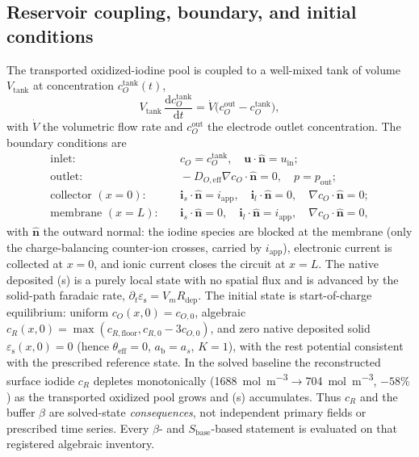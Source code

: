 \documentclass[11pt]{article}
\newcommand{\epss}{\varepsilon_{\mathrm{s}}}
\newcommand{\iapp}{i_{\mathrm{app}}}
\begin{document}
\subsection{Reservoir coupling, boundary, and initial conditions}\label{sec:tankbc}
The transported oxidized-iodine pool is coupled to a well-mixed tank of volume $V_{\mathrm{tank}}$ at
concentration $c_O^{\mathrm{tank}}(t)$,
\begin{equation}
V_{\mathrm{tank}}\,\frac{\mathrm{d}c_O^{\mathrm{tank}}}{\mathrm{d}t}
=\dot V\bigl(c_O^{\mathrm{out}}-c_O^{\mathrm{tank}}\bigr),
\label{eq:tank}
\end{equation}
with $\dot V$ the volumetric flow rate and $c_O^{\mathrm{out}}$ the electrode outlet concentration. The
boundary conditions are
\begin{align}
\text{inlet:}&\quad c_O=c_O^{\mathrm{tank}},\quad \mathbf{u}\!\cdot\!\hat{\mathbf n}=u_{\mathrm{in}};
\label{eq:bcin}\\
\text{outlet:}&\quad -D_{O,\mathrm{eff}}\nabla c_O\!\cdot\!\hat{\mathbf n}=0,\quad p=p_{\mathrm{out}};
\label{eq:bcout}\\
\text{collector }(x{=}0):&\quad \mathbf{i}_s\!\cdot\!\hat{\mathbf n}=\iapp,\quad
\mathbf{i}_l\!\cdot\!\hat{\mathbf n}=0,\quad \nabla c_O\!\cdot\!\hat{\mathbf n}=0;
\label{eq:bccc}\\
\text{membrane }(x{=}L):&\quad \mathbf{i}_s\!\cdot\!\hat{\mathbf n}=0,\quad
\mathbf{i}_l\!\cdot\!\hat{\mathbf n}=\iapp,\quad \nabla c_O\!\cdot\!\hat{\mathbf n}=0,
\label{eq:bcmem}
\end{align}
with $\hat{\mathbf n}$ the outward normal: the iodine species are blocked at the membrane (only the
charge-balancing counter-ion crosses, carried by $\iapp$), electronic current is collected at $x=0$, and
ionic current closes the circuit at $x=L$. The native deposited (s) is a purely local state with no
spatial flux and is advanced by the solid-path faradaic rate, $\partial_t\epss=V_mR_{\mathrm{dep}}$.
The initial state is start-of-charge equilibrium: uniform $c_O(x,0)=c_{O,0}$, algebraic
$c_R(x,0)=\max(c_{R,\mathrm{floor}},c_{R,0}-3c_{O,0})$, and zero native deposited solid
$\epss(x,0)=0$ (hence $\theta_{\mathrm{eff}}=0$, $a_{\mathrm b}=a_s$, $K=1$), with the rest potential
consistent with the prescribed reference state. In the solved baseline the reconstructed surface iodide
$c_R$ depletes monotonically (\SI{1688}{mol.m^{-3}}$\to$\SI{704}{mol.m^{-3}}, $-58\%$) as the transported
oxidized pool grows and (s) accumulates. Thus $c_R$ and the buffer $\beta$ are solved-state
\emph{consequences}, not independent primary fields or prescribed time series. Every $\beta$- and
$S_{\mathrm{base}}$-based statement is evaluated on that registered algebraic inventory.
\end{document}
